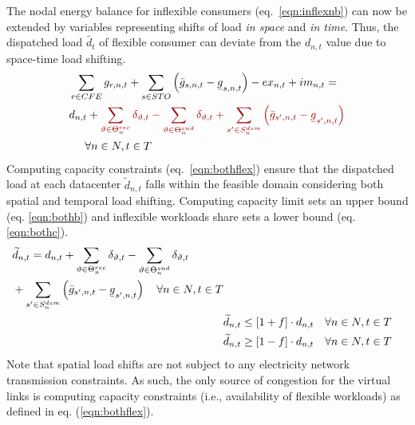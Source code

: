The nodal energy balance for inflexible consumers (eq.~\ref{eqn:inflexnb}) can now be extended by variables representing shifts of load \textit{in space} and \textit{in time}. Thus, the dispatched load  $\widetilde{d_{t}}$ of flexible consumer can deviate from the $d_{n,t}$ value due to space-time load shifting.
\begin{equation}
    \begin{split}
    &\sum_{r\in CFE} g_{r,n,t} + \sum_{s\in STO} \left(\bar{g}_{s,n,t} - \ubar{g}_{s,n,t}\right) - ex_{n,t} + im_{n,t}  = \\
    & d_{n,t} + \textcolor{darkred}{\sum_{\vartheta \in \Theta_n^{rec}}\delta_{\vartheta, t} - \sum_{\vartheta \in \Theta_n^{snd}}\delta_{\vartheta, t} + \sum_{{s'} \in S_n^{dsm}} \left(\bar{g}_{s',n,t} - \ubar{g}_{s',n,t}\right)} \\
    & \hspace{.5cm} \forall n \in N, t \in T
    \label{eqn:bothnb}
    \end{split}
\end{equation}
Computing capacity constraints (eq.~\ref{eqn:bothflex}) ensure that the dispatched load at each datacenter  $\widetilde{d}_{n,t}$ falls within the feasible domain considering both spatial and temporal load shifting. Computing capacity limit sets an upper bound (eq. \ref{eqn:bothb}) and inflexible workloads share sets a lower bound (eq. \ref{eqn:bothc}).
\begin{subequations}
    \begin{align}
      \begin{split}
        &\widetilde{d}_{n,t} =  d_{n,t} + \sum_{\vartheta \in \Theta_n^{rec}}\delta_{\vartheta, t} - \sum_{\vartheta \in \Theta_n^{snd}}\delta_{\vartheta, t} \\
        &+ \sum_{{s'} \in S_n^{dsm}} \left(\bar{g}_{s',n,t} - \ubar{g}_{s',n,t}\right) \quad \forall n \in N, t \in T \\
      \end{split}
      \label{eqn:botha} \\
      &\widetilde{d}_{n,t} \le [1+f] \cdot d_{n,t}  \quad \forall n \in N, t \in T \label{eqn:bothb} \\
      &\widetilde{d}_{n,t} \ge [1-f] \cdot d_{n,t}  \quad \forall n \in N, t \in T \label{eqn:bothc}
    \end{align}
    \label{eqn:bothflex}
\end{subequations}
Note that spatial load shifts are not subject to any electricity network transmission constraints. As such, the only source of congestion for the virtual links is computing capacity constraints (i.e., availability of flexible workloads) as defined in eq. (\ref{eqn:bothflex}).

